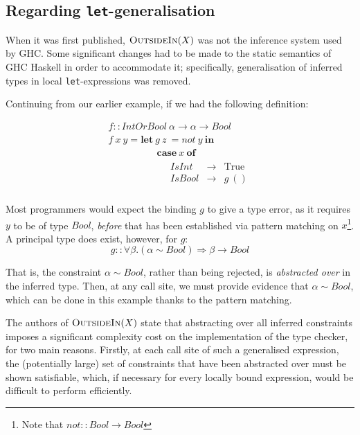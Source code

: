 \documentclass[a4paper]{jfp}
\newcommand{\outsidein}{\textsc{OutsideIn}(X)}
\begin{document}
\subsection{Regarding {\tt let}-generalisation}

When it was first published, $\outsidein$ was not the inference system used by GHC\@. Some significant changes had to be made to the static semantics
of GHC Haskell in order to accommodate it; specifically, generalisation of inferred types in local {\tt let}-expressions was removed. 

Continuing from our earlier example, if we had the following definition:

\nopagebreak

\begin{displaymath}
\begin{array}{ll}
\mathit{f} :: \mathit{IntOrBool}\ \alpha \rightarrow \alpha \rightarrow \mathit{Bool} \\
\mathit{f}\ x\ y = \textbf{let}\ g\ z\ = \mathit{not}\ y\ \textbf{in}  \\
\quad\quad\quad\quad\quad\textbf{case}\ x\ \textbf{of} \\
\quad\quad\quad\quad\quad\quad\begin{array}{lll}
   \mathit{IsInt} & \rightarrow & \text{True} \\
   \mathit{IsBool} & \rightarrow & g\ ()\\
   \end{array}
\end{array}
\end{displaymath}

Most programmers would expect the binding $g$ to give a type error, as it requires $y$ to be of type $\mathit{Bool}$, \emph{before} that has been 
established via pattern matching on $x$\footnote{Note that 
   $\mathit{not} :: \mathit{Bool} \rightarrow \mathit{Bool}$}. 
A principal type does exist, however, for $g$: 
\begin{displaymath}
   g :: \forall \beta. (\alpha \sim \mathit{Bool}) \Rightarrow \beta \rightarrow \mathit{Bool}
\end{displaymath}

That is, the constraint $\alpha \sim \mathit{Bool}$, rather than being rejected, is \emph{abstracted over} in the inferred type. Then, at any call site,
we must provide evidence that $\alpha \sim \mathit{Bool}$, which can be done in this example thanks to the pattern matching. 

The authors of $\outsidein$ state that abstracting over all inferred constraints imposes a significant complexity cost on the implementation of the
type checker, for two main reasons. Firstly, at each call site of such a generalised expression, the (potentially large) set of constraints that have
been abstracted over must be shown satisfiable, which, if necessary for every locally bound expression, would be difficult to perform efficiently.
\end{document}
